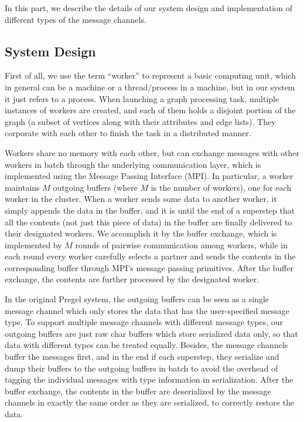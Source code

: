 \documentclass{sokendai_thesis} %
\begin{document}
In this part, we describe the details of our system design and implementation of different types of the message channels.

\subsection{System Design}

First of all, we use the term ``worker'' to represent a basic computing unit, which in general can be a machine or a thread/process in a machine, but in our system it just refers to a process.
When launching a graph processing task, multiple instances of workers are created, and each of them holds a disjoint portion of the graph (a subset of vertices along with their attributes and edge lists).
They corporate with each other to finish the task in a distributed manner.

Workers share no memory with each other, but can exchange messages with other workers in batch through the underlying communication layer, which is implemented using the Message Passing Interface (MPI).
In particular, a worker maintains $M$ outgoing buffers (where $M$ is the number of workers), one for each worker in the cluster.
When a worker sends some data to another worker, it simply appends the data in the buffer, and it is until the end of a superstep that all the contents (not just this piece of data) in the buffer are finally delivered to their designated workers.
We accomplish it by the buffer exchange, which is implemented by $M$ rounds of pairwise communication among workers, while in each round every worker carefully selects a partner and sends the contents in the corresponding buffer through MPI's message passing primitives.
After the buffer exchange, the contents are further processed by the designated worker.

In the original Pregel system, the outgoing buffers can be seen as a single message channel which only stores the data that has the user-specified message type.
To support multiple message channels with different message types, our outgoing buffers are just raw char buffers which store serialized data only, so that data with different types can be treated equally.
Besides, the message channels buffer the messages first, and in the end if each superstep, they serialize and dump their buffers to the outgoing buffers in batch to avoid the overhead of tagging the individual messages with type information in serialization.
After the buffer exchange, the contents in the buffer are deserialized by the message channels in exactly the same order as they are serialized, to correctly restore the data.
\end{document}
